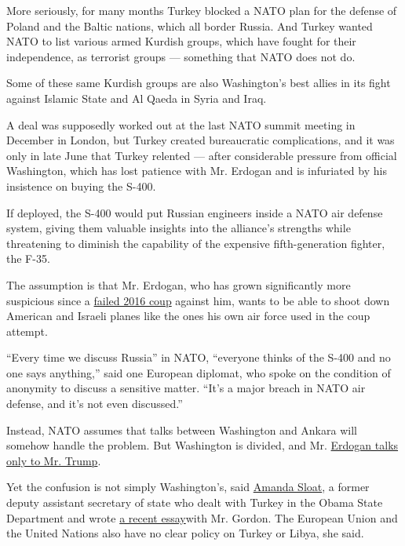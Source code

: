 More seriously, for many months Turkey blocked a NATO plan for the
defense of Poland and the Baltic nations, which all border Russia. And
Turkey wanted NATO to list various armed Kurdish groups, which have
fought for their independence, as terrorist groups --- something that
NATO does not do.

Some of these same Kurdish groups are also Washington's best allies in
its fight against Islamic State and Al Qaeda in Syria and Iraq.

A deal was supposedly worked out at the last NATO summit meeting in
December in London, but Turkey created bureaucratic complications, and
it was only in late June that Turkey relented --- after considerable
pressure from official Washington, which has lost patience with Mr.
Erdogan and is infuriated by his insistence on buying the S-400.

If deployed, the S-400 would put Russian engineers inside a NATO air
defense system, giving them valuable insights into the alliance's
strengths while threatening to diminish the capability of the expensive
fifth-generation fighter, the F-35.

The assumption is that Mr. Erdogan, who has grown significantly more
suspicious since a
\href{https://www.nytimes.com/interactive/2016/07/16/world/europe/turkey-coup-photos.html}{failed
2016 coup} against him, wants to be able to shoot down American and
Israeli planes like the ones his own air force used in the coup attempt.

``Every time we discuss Russia'' in NATO, ``everyone thinks of the S-400
and no one says anything,'' said one European diplomat, who spoke on the
condition of anonymity to discuss a sensitive matter. ``It's a major
breach in NATO air defense, and it's not even discussed.''

Instead, NATO assumes that talks between Washington and Ankara will
somehow handle the problem. But Washington is divided, and Mr.
\href{https://www.nytimes.com/2020/06/10/world/europe/erdogan-trump-turkey-libya-syria.html}{Erdogan
talks only to Mr. Trump}.

Yet the confusion is not simply Washington's, said
\href{https://ash.harvard.edu/people/amanda-sloat}{Amanda Sloat}, a
former deputy assistant secretary of state who dealt with Turkey in the
Obama State Department and wrote
\href{https://www.foreignaffairs.com/articles/turkey/2020-01-10/dangerous-unraveling-us-turkish-alliance}{a
recent essay}with Mr. Gordon. The European Union and the United Nations
also have no clear policy on Turkey or Libya, she said.

